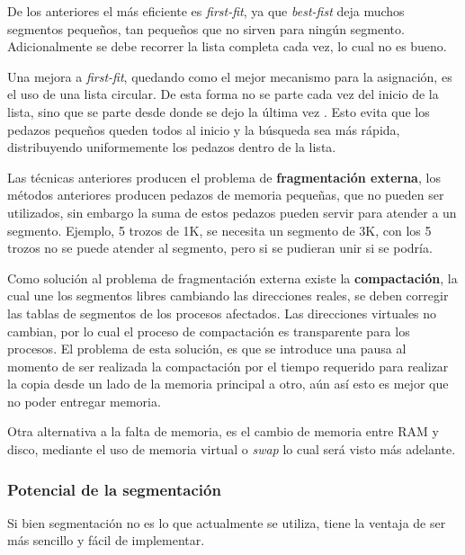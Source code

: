 De los anteriores el más eficiente es \textit{first-fit}, ya que
\textit{best-fist} deja muchos segmentos pequeños, tan pequeños que no sirven
para ningún segmento. Adicionalmente se debe recorrer la lista completa cada
vez, lo cual no es bueno.

Una mejora a \textit{first-fit}, quedando como el mejor mecanismo para la
asignación, es el uso de una lista circular. De esta forma no se parte cada vez
del inicio de la lista, sino que se parte desde donde se dejo la última vez .
Esto evita que los pedazos pequeños queden todos al inicio y la búsqueda sea más
rápida, distribuyendo uniformemente los pedazos dentro de la lista.

Las técnicas anteriores producen el problema de \textbf{fragmentación externa},
los métodos anteriores producen pedazos de memoria pequeñas, que no pueden ser
utilizados, sin embargo la suma de estos pedazos pueden servir para atender a un
segmento. Ejemplo, 5 trozos de 1K, se necesita un segmento de 3K, con los 5
trozos no se puede atender al segmento, pero si se pudieran unir si se podría.

Como solución al problema de fragmentación externa existe la
\textbf{compactación}, la cual une los segmentos libres cambiando las
direcciones reales, se deben corregir las tablas de segmentos de los procesos
afectados. Las direcciones virtuales no cambian, por lo cual el proceso de
compactación es transparente para los procesos. El problema de esta solución, es
que se introduce una pausa al momento de ser realizada la compactación por el
tiempo requerido para realizar la copia desde un lado de la memoria principal a
otro, aún así esto es mejor que no poder entregar memoria.

Otra alternativa a la falta de memoria, es el cambio de memoria entre RAM y
disco, mediante el uso de memoria virtual o \textit{swap} lo cual será visto más
adelante.

\subsubsection{Potencial de la segmentación}
Si bien segmentación no es lo que actualmente se utiliza, tiene la ventaja de
ser más sencillo y fácil de implementar.

